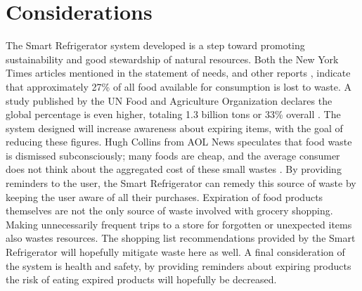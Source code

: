 \documentclass[11pt]{article} %
\begin{document}
\section{Considerations}
The Smart Refrigerator system developed is a step toward promoting sustainability and good stewardship of natural resources. Both the New York Times articles mentioned in the statement of needs, and other reports \cite{times, aol}, indicate that approximately 27\% of all food available for consumption is lost to waste. A study published by the UN Food and Agriculture Organization declares the global percentage is even higher, totaling 1.3 billion tons or 33\% overall \cite{dutch}. The system designed will increase awareness about expiring items, with the goal of reducing these figures. Hugh Collins from AOL News speculates that food waste is dismissed subconsciously; many foods are cheap, and the average consumer does not think about the aggregated cost of these small wastes \cite{aol}. By providing reminders to the user, the Smart Refrigerator can remedy this source of waste by keeping the user aware of all their purchases. Expiration of food products themselves are not the only source of waste involved with grocery shopping. Making unnecessarily frequent trips to a store for forgotten or unexpected items also wastes resources. The shopping list recommendations provided by the Smart Refrigerator will hopefully mitigate waste here as well. A final consideration of the system is health and safety, by providing reminders about expiring products the risk of eating expired products will hopefully be decreased. 
\end{document}
